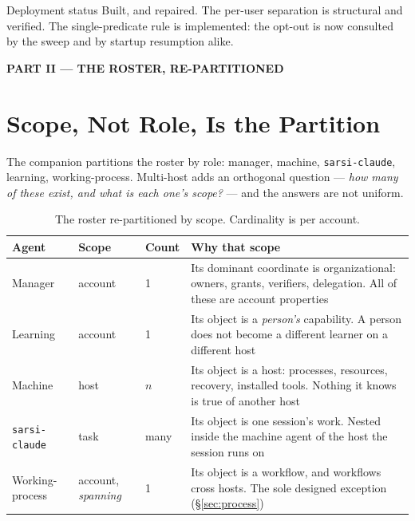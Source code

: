 \documentclass[11pt]{article}
\newcommand{\code}[1]{\texttt{\small #1}}
\begin{document}
\begin{notebox}{Deployment status}
Built, and repaired. The per-user separation is structural and verified. The single-predicate rule is implemented: the opt-out is now consulted by the sweep and by startup resumption alike.
\end{notebox}

\newpage
\begin{center}\large\bfseries PART II --- THE ROSTER, RE-PARTITIONED\end{center}

\section{Scope, Not Role, Is the Partition}
\label{sec:roster}

The companion partitions the roster by role: manager, machine, \code{sarsi-claude}, learning, working-process. Multi-host adds an orthogonal question --- \emph{how many of these exist, and what is each one's scope?} --- and the answers are not uniform.

\begin{table}[h]
\centering\small
\caption{The roster re-partitioned by scope. Cardinality is per account.}
\label{tab:scope}
\begin{tabular}{@{}L{3.1cm}L{2.0cm}L{1.5cm}L{6.3cm}@{}}
\toprule
\textbf{Agent} & \textbf{Scope} & \textbf{Count} & \textbf{Why that scope} \\
\midrule
Manager & account & 1 & Its dominant coordinate is organizational: owners, grants, verifiers, delegation. All of these are account properties \\
Learning & account & 1 & Its object is a \emph{person's} capability. A person does not become a different learner on a different host \\
Machine & host & $n$ & Its object is a host: processes, resources, recovery, installed tools. Nothing it knows is true of another host \\
\code{sarsi-claude} & task & many & Its object is one session's work. Nested inside the machine agent of the host the session runs on \\
Working-process & account, \emph{spanning} & 1 & Its object is a workflow, and workflows cross hosts. The sole designed exception (\S\ref{sec:process}) \\
\bottomrule
\end{tabular}
\end{table}
\end{document}
